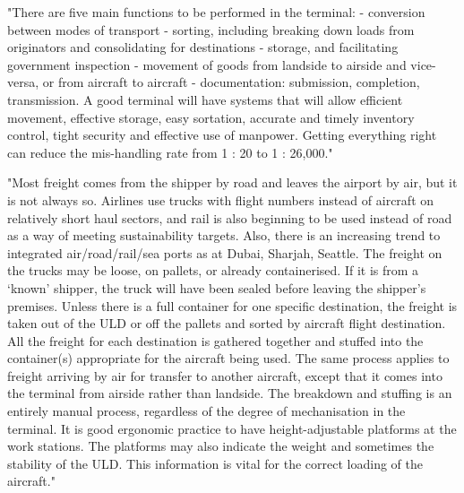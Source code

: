 "There are five main functions to be performed in the terminal:
- conversion between modes of transport
- sorting, including breaking down loads from originators and consolidating for destinations
- storage, and facilitating government inspection
- movement of goods from landside to airside and vice-versa, or from aircraft to aircraft
- documentation: submission, completion, transmission.
A good terminal will have systems that will allow efficient movement, effective storage, easy sortation, accurate and timely inventory control, tight security and effective use of manpower. Getting everything right can reduce the mis-handling rate from 1 : 20 to 1 : 26,000."


"Most freight comes from the shipper by road and leaves the airport by air, but it is not always so. Airlines use trucks with flight numbers instead of aircraft on relatively short haul sectors, and rail is also beginning to be used instead of road as a way of meeting sustainability targets. Also, there is an increasing trend to integrated air/road/rail/sea ports as at Dubai, Sharjah, Seattle. The freight on the trucks may be loose, on pallets, or already containerised. If it is from a ‘known’ shipper, the truck will have been sealed before leaving the shipper’s premises.
Unless there is a full container for one specific destination, the freight is taken out of the ULD or off the pallets and sorted by aircraft flight destination. All the freight for each destination is gathered together and stuffed into the container(s) appropriate for the aircraft being used. The same process applies to freight arriving by air for transfer to another aircraft, except that it comes into the terminal from airside rather than landside. The breakdown and stuffing is an entirely manual process, regardless of the degree of mechanisation in the terminal. It is good ergonomic practice to have height-adjustable platforms at the work stations. The platforms may also indicate the weight and sometimes the stability of the ULD. This information is vital for the correct loading of the aircraft."


